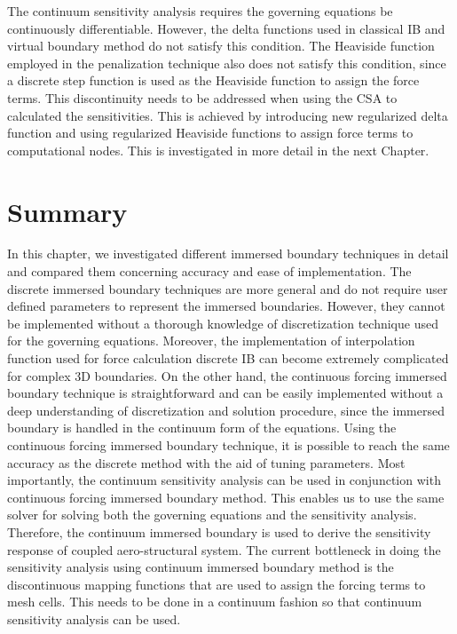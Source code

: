 The continuum sensitivity analysis requires the governing equations be continuously differentiable. However, the delta functions used in classical IB and virtual boundary method do not satisfy this condition. The Heaviside function employed in the penalization technique also does not satisfy this condition, since a discrete step function is used as the Heaviside function to assign the force terms. This discontinuity needs to be addressed when using the CSA to calculated the sensitivities. This is achieved by introducing new regularized delta function and using regularized Heaviside functions to assign force terms to computational nodes. This is investigated in more detail in the next Chapter.
\section{Summary}
In this chapter, we investigated different immersed boundary techniques in detail and compared them concerning accuracy and ease of implementation. The discrete immersed boundary techniques are more general and do not require user defined parameters to represent the immersed boundaries. However, they cannot be implemented without a thorough knowledge of discretization technique used for the governing equations. Moreover, the implementation of interpolation function used for force calculation discrete IB can become extremely complicated for complex 3D boundaries. On the other hand, the continuous forcing immersed boundary technique is straightforward and can be easily implemented without a deep understanding of discretization and solution procedure, since the immersed boundary is handled in the continuum form of the equations. Using the continuous forcing immersed boundary technique, it is possible to reach the same accuracy as the discrete method with the aid of tuning parameters. Most importantly, the continuum sensitivity analysis can be used in conjunction with continuous forcing immersed boundary method. This enables us to use the same solver for solving both the governing equations and the sensitivity analysis. Therefore, the continuum immersed boundary is used to derive the sensitivity response of coupled aero-structural system. The current bottleneck in doing the sensitivity analysis using continuum immersed boundary method is the discontinuous mapping functions that are used to assign the forcing terms to mesh cells. This needs to be done in a continuum fashion so that continuum sensitivity analysis can be used.